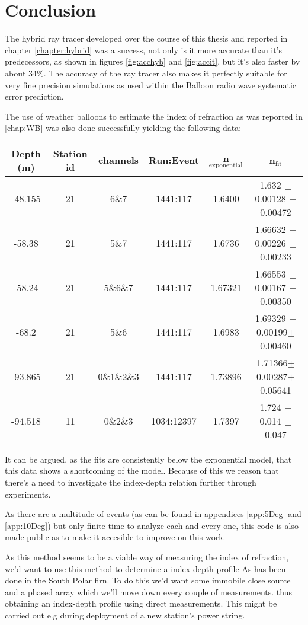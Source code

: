 \chapter*{Conclusion}
The hybrid ray tracer developed over the course of this thesis and reported in
chapter \ref{chapter:hybrid} was a success, not only is it more accurate than
it's predecessors, as shown in figures \ref{fig:acchyb} and \ref{fig:accit},
 but it's also faster by about 34\%.  The accuracy of the ray tracer also
makes it perfectly suitable for very fine precision simulations as used within
the Balloon radio wave systematic error prediction.

The use of weather balloons to estimate the index of refraction as
was reported in \ref{chap:WB} was also done successfully 
yielding the following data:
\begin{center}
\begin{tabular}{||c c c c c c||}
 \hline
 Depth (m) & Station id & channels & Run:Event & n$_\text{exponential}$ & n$_\text{fit}$\\ [0.5ex]
 \hline\hline
 -48.155 & 21 & 6\&7 & 1441:117 & 1.6400 & 1.632 $\pm$ 0.00128 $\pm$ 0.00472\\
 -58.38 & 21 & 5\&7 & 1441:117 & 1.6736 & 1.66632 $\pm$ 0.00226 $\pm$ 0.00233 \\
 -58.24 & 21 & 5\&6\&7 & 1441:117 & 1.67321 & 1.66553 $\pm$ 0.00167 $\pm$ 0.00350 \\
 -68.2 & 21 & 5\&6 & 1441:117 & 1.6983 & 1.69329 $\pm$0.00199$\pm$0.00460 \\
 -93.865 & 21 & 0\&1\&2\&3 & 1441:117 & 1.73896 & 1.71366$\pm$0.00287$\pm$0.05641\\
 -94.518 & 11 & 0\&2\&3 & 1034:12397 & 1.7397 & 1.724 $\pm$ 0.014 $\pm$ 0.047 \\
 \hline
\end{tabular}
\end{center}
It can be argued, as the fits are consistently below the exponential model,
that this data shows a shortcoming of the model.  Because of this we reason
that there's a need to investigate the index-depth relation further through 
experiments.

As there are a multitude of events (as can be found in appendices
\ref{app:5Deg} and \ref{app:10Deg}) but only finite time to analyze each and
every one, this code is also made public \cite{projects-mt} as to make
it accesible to improve on this work.  

As this method seems to be a viable way of measuring the index of refraction,
we'd want to use this method to determine a index-depth profile
As has been done in the South Polar firn\cite{kravchenko_besson_meyers_2004}.
To do this we'd want some immobile close source and a phased array which we'll
move down every couple of measurements. thus obtaining an index-depth profile
using direct measurements. This might be carried out e.g during deployment
of a new station's power string.
